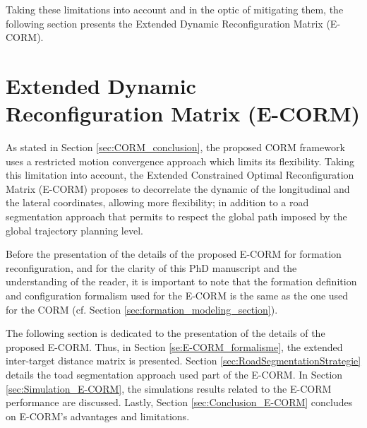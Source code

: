 Taking these limitations into account and in the optic of mitigating them, the following section presents the Extended Dynamic Reconfiguration Matrix (E-CORM). 













\newpage
\section{Extended Dynamic Reconfiguration Matrix (E-CORM)} \label{sec:E-CORM}
As stated in Section \ref{sec:CORM_conclusion}, the proposed CORM framework uses a restricted motion convergence approach which limits its flexibility. Taking this limitation into account, the Extended Constrained Optimal Reconfiguration Matrix (E-CORM) proposes to decorrelate the dynamic of the longitudinal and the lateral coordinates, allowing more flexibility; in addition to a road segmentation approach that permits to respect the global path imposed by the global trajectory planning level. 

Before the presentation of the details of the proposed E-CORM for formation reconfiguration, and for the clarity of this PhD manuscript and the understanding of the reader, it is important to note that the formation definition and configuration formalism used for the E-CORM is the same as the one used for the CORM (cf. Section \ref{sec:formation_modeling_section}). 

The following section is dedicated to the presentation of the details of the proposed E-CORM. Thus, in Section \ref{se:E-CORM_formalisme}, the extended inter-target distance matrix is presented. Section \ref{sec:RoadSegmentationStrategie} details the toad segmentation approach used part of the E-CORM. In Section \ref{sec:Simulation_E-CORM}, the simulations results related to the E-CORM performance are discussed. Lastly, Section \ref{sec:Conclusion_E-CORM} concludes on E-CORM's advantages and limitations. 




